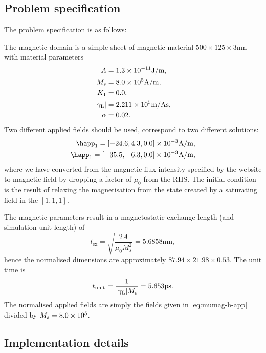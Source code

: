 \subsection{Problem specification}

The problem specification is as follows:

The magnetic domain is a simple sheet of magnetic material $500 \times 125 \times 3$nm with material parameters
\begin{equation}
  \begin{aligned}
    A &= 1.3\times 10^{-11} \text{J/m}, \\
    M_s &= 8.0\times 10^{5} \text{A/m}, \\
    K_1 &= 0.0, \\
    {\left|{\gamma_{\mathrm{\tiny{L}}}} \right|} &= 2.211 \times 10^{5} \text{m/As}, \\
    \alpha &= 0.02.
  \end{aligned}
\end{equation}
Two different applied fields should be used, correspond to two different solutions:
\begin{equation}
  \begin{aligned}
    \happ_1 = [-24.6, 4.3, 0.0] \E{-3}\text{A/m}, \\
    \happ_1 = [-35.5, -6.3, 0.0] \E{-3}\text{A/m}, \\
  \end{aligned}
  \label{eq:mumag-h-app}
\end{equation}
where we have converted from the magnetic flux intensity specified by the \mumag website to magnetic field by dropping a factor of $\mu_0$ from the RHS.
The initial condition is the result of relaxing the magnetisation from the state created by a saturating field in the $[1,1,1]$.

The magnetic parameters result in a magnetostatic exchange length (and simulation unit length) of
\begin{equation}
  l_{\text{ex}} = \sqrt{\frac{2A}{\mu_0 M_s^2}} = 5.6858\text{nm},
\end{equation}
hence the normalised dimensions are approximately $87.94 \times 21.98 \times 0.53$.
The unit time is
\begin{equation}
  t_{\text{unit}} = \frac{1}{{\left|{\gamma_{\mathrm{\tiny{L}}}} \right|} M_s} = 5.653\text{ps}.
\end{equation}
The normalised applied fields are simply the fields given in \cref{eq:mumag-h-app} divided by $M_s = 8.0\times 10^{5}$.

\subsection{Implementation details}

